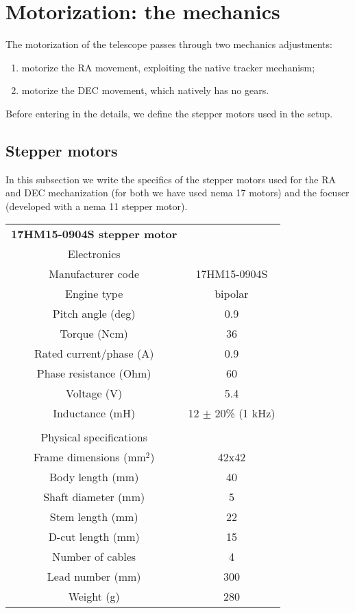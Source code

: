 \section{Motorization: the mechanics}
The motorization of the telescope passes through two mechanics adjustments:
\begin{enumerate}
    \item motorize the RA movement, exploiting the native tracker mechanism;
    \item motorize the DEC movement, which natively has no gears.
\end{enumerate}
Before entering in the details, we define the stepper motors used in the setup.

\subsection{Stepper motors}
In this subsection we write the specifics of the stepper motors used for the RA and DEC mechanization (for both we have used nema 17 motors) and the focuser (developed with a nema 11 stepper motor).

\begin{minipage}{0.5\textwidth}
    \centering
    \begin{tabular}{cc}
        \textbf{17HM15-0904S stepper motor}&\\
        Electronics&\\
        \hline
        Manufacturer code & 17HM15-0904S\\
        Engine type & bipolar\\
        Pitch angle (deg) & 0.9 \\
        Torque (Ncm)& 36\\
        Rated current/phase (A) & 0.9\\
        Phase resistance (Ohm)& 60\\
        Voltage (V)& 5.4\\
        Inductance (mH)& 12 \(\pm\) 20\% (1 kHz)\\
         & \\
        Physical specifications&\\
        \hline
        Frame dimensions (mm\(^2\))& 42x42 \\
        Body length (mm)& 40 \\
        Shaft diameter (mm)& 5 \\
        Stem length (mm)& 22 \\
        D-cut length (mm)& 15 \\
        Number of cables & 4\\
        Lead number (mm)& 300 \\
        Weight (g) & 280\\
        \hline
    \end{tabular}
    \label{tab:nema_17_specifics}
\end{minipage}

